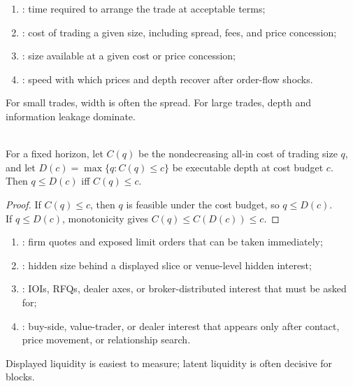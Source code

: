 \begin{taxonomy} 
\begin{enumerate}[label=\roman*.]
\setlength{\itemsep}{0pt}
\item {}: time required to arrange the trade at acceptable terms;
\item {}: cost of trading a given size, including spread, fees, and price concession;
\item {}: size available at a given cost or price concession;
\item {}: speed with which prices and depth recover after order-flow shocks.
\end{enumerate}
For small trades, width is often the spread. For large trades, depth and information leakage dominate.
\end{taxonomy}

\begin{proposition} \\
For a fixed horizon, let $C(q)$ be the nondecreasing all-in cost of trading size $q$, and let $D(c)=\max\{q:C(q)\le c\}$ be executable depth at cost budget $c$. Then $q\le D(c)$ iff $C(q)\le c$.
\begin{proof}
If $C(q)\le c$, then $q$ is feasible under the cost budget, so $q\le D(c)$.\\
If $q\le D(c)$, monotonicity gives $C(q)\le C(D(c))\le c$.
\end{proof}
\end{proposition}

\begin{taxonomy} 
\begin{enumerate}[label=\roman*.]
\setlength{\itemsep}{0pt}
\item {}: firm quotes and exposed limit orders that can be taken immediately;
\item {}: hidden size behind a displayed slice or venue-level hidden interest;
\item {}: IOIs, RFQs, dealer axes, or broker-distributed interest that must be asked for;
\item {}: buy-side, value-trader, or dealer interest that appears only after contact, price movement, or relationship search.
\end{enumerate}
Displayed liquidity is easiest to measure; latent liquidity is often decisive for blocks.
\end{taxonomy}

